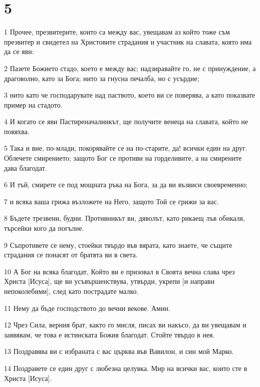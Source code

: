 \chapter{5}

\par 1 Прочее, презвитерите, които са между вас, увещавам аз който тоже съм презвитер и свидетел на Христовите страдания и участник на славата, която има да се яви:
\par 2 Пазете Божието стадо, което е между вас; надзиравайте го, не с принуждение, а драговолно, като за Бога; нито за гнусна печалба, но с усърдие;
\par 3 нито като че господарувате над паството, което ви се поверява, а като показвате пример на стадото.
\par 4 И когато се яви Пастиреначалникът, ще получите венеца на славата, който не повяхва.
\par 5 Така и вие, по-млади, покорявайте се на по-старите, да! всички един на друг. Облечете смирението; защото Бог се противи на горделивите, а на смирените дава благодат.
\par 6 И тъй, смирете се под мощната ръка на Бога, за да ви възвиси своевременно;
\par 7 и всяка ваша грижа възложете на Него, защото Той се грижи за вас.
\par 8 Бъдете трезвени, будни. Противникът ви, дяволът, като рикаещ лъв обикаля, търсейки кого да погълне.
\par 9 Съпротивете се нему, стоейки твърдо във вярата, като знаете, че същите страдания се понасят от братята ви в света.
\par 10 А Бог на всяка благодат, Който ви е призовал в Своята вечна слава чрез Христа [Исуса], ще ви усъвършенствува, утвърди, укрепи [и направи непоколебими], след като пострадате малко.
\par 11 Нему да бъде господството до вечни векове. Амин.
\par 12 Чрез Сила, верния брат, както го мисля, писах ви накъсо, да ви увещавам и заявявам, че това е истинската Божия благодат. Стойте твърдо в нея.
\par 13 Поздравява ви с избраната с вас църква във Вавилон, и син мой Марко.
\par 14 Поздравете се един друг с любезна целувка. Мир на всички вас, които сте в Христа [Исуса].

